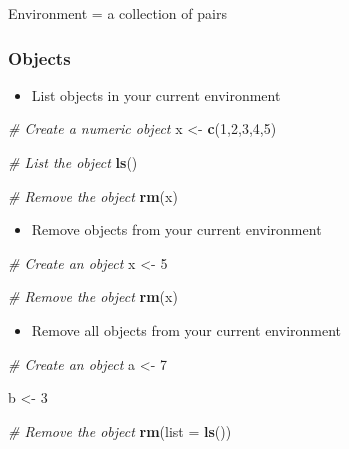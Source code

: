 \documentclass[
]{book}
\newenvironment{Shaded}{\begin{snugshade}}{\end{snugshade}}
\newcommand{\CommentTok}[1]{\textcolor[rgb]{0.56,0.35,0.01}{\textit{#1}}}
\newcommand{\DataTypeTok}[1]{\textcolor[rgb]{0.13,0.29,0.53}{#1}}
\newcommand{\DecValTok}[1]{\textcolor[rgb]{0.00,0.00,0.81}{#1}}
\newcommand{\KeywordTok}[1]{\textcolor[rgb]{0.13,0.29,0.53}{\textbf{#1}}}
\newcommand{\NormalTok}[1]{#1}
\newcommand{\StringTok}[1]{\textcolor[rgb]{0.31,0.60,0.02}{#1}}
\providecommand{\tightlist}{%
  \setlength{\itemsep}{0pt}\setlength{\parskip}{0pt}}
\begin{document}
Environment = a collection of pairs

\hypertarget{objects}{%
\subsubsection{Objects}\label{objects}}

\begin{itemize}
\tightlist
\item
  List objects in your current environment
\end{itemize}

\begin{Shaded}
\begin{Highlighting}[]
\CommentTok{\# Create a numeric object }
\NormalTok{x \textless{}{-}}\StringTok{ }\KeywordTok{c}\NormalTok{(}\DecValTok{1}\NormalTok{,}\DecValTok{2}\NormalTok{,}\DecValTok{3}\NormalTok{,}\DecValTok{4}\NormalTok{,}\DecValTok{5}\NormalTok{)}

\CommentTok{\# List the object }
\KeywordTok{ls}\NormalTok{()}

\CommentTok{\# Remove the object }
\KeywordTok{rm}\NormalTok{(x)}
\end{Highlighting}
\end{Shaded}

\begin{itemize}
\tightlist
\item
  Remove objects from your current environment
\end{itemize}

\begin{Shaded}
\begin{Highlighting}[]
\CommentTok{\# Create an object }
\NormalTok{x \textless{}{-}}\StringTok{ }\DecValTok{5}

\CommentTok{\# Remove the object }
\KeywordTok{rm}\NormalTok{(x)}
\end{Highlighting}
\end{Shaded}

\begin{itemize}
\tightlist
\item
  Remove all objects from your current environment
\end{itemize}

\begin{Shaded}
\begin{Highlighting}[]
\CommentTok{\# Create an object }
\NormalTok{a \textless{}{-}}\StringTok{ }\DecValTok{7}

\NormalTok{b \textless{}{-}}\StringTok{ }\DecValTok{3}

\CommentTok{\# Remove the object }
\KeywordTok{rm}\NormalTok{(}\DataTypeTok{list =} \KeywordTok{ls}\NormalTok{())}
\end{Highlighting}
\end{Shaded}
\end{document}
